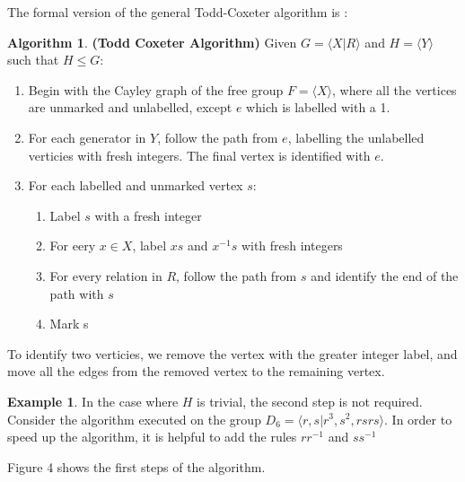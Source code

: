 \documentclass[10pt]{article}
\theoremstyle{plain}
\theoremstyle{definition}
\newtheorem{example}[theorem]{Example}
\theoremstyle{definition}
\newtheorem{algorithm}[theorem]{Algorithm}
\theoremstyle{definition}
\begin{document}
\begin{multicols}{2}
The formal version of the general Todd-Coxeter algorithm is \cite{ToddCoxeter}:

\begin{algorithm}
	\textbf{(Todd Coxeter Algorithm)} Given $G = \langle X | R \rangle$ and $ H = \langle Y \rangle $ such that $H \leq G$:

	\begin{enumerate}
		\setlength\itemsep{0em}
		\item Begin with the Cayley graph of the free group $F = \langle X \rangle$, where all the vertices are unmarked and unlabelled, except $e$ which is labelled with a 1.
		\item For each generator in $Y$, follow the path from $e$, labelling the unlabelled verticies with fresh integers. The final vertex is identified with $e$.
		\item For each labelled and unmarked vertex $s$:
			\begin{enumerate}
				\setlength\itemsep{0em}
				\item Label $s$ with a fresh integer
				\item For eery $x \in X$, label $xs$ and $x^{-1} s$ with fresh integers
				\item For every relation in $R$, follow the path from $s$ and identify the end of the path with $s$
				\item Mark s
			\end{enumerate}	
	\end{enumerate}

	To identify two verticies, we remove the vertex with the greater integer label, and move all the edges from the removed vertex to the remaining vertex.
\end{algorithm}

\begin{example}
	In the case where $H$ is trivial, the second step is not required. Consider the algorithm executed on the group $ D_6 = \langle r, s | r^3, s^2, rsrs \rangle $. In order to speed up the algorithm, it is helpful to add the rules $r r^{-1}$ and $s s^{-1}$
	
	Figure 4 shows the first steps of the algorithm.


\end{example}
\end{multicols}
\end{document}
